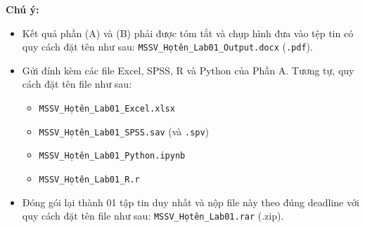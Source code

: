 \textbf{Chú ý:}
\begin{itemize}
    \item Kết quả phần (A) và (B) phải được tóm tắt và chụp hình đưa vào tệp tin có quy cách đặt tên như sau: \texttt{MSSV\_Họtên\_Lab01\_Output.docx} (\texttt{.pdf}).
    \item Gửi đính kèm các file Excel, SPSS, R và Python của Phần A. Tương tự, quy cách đặt tên file như sau:
    \begin{itemize}
        \item \texttt{MSSV\_Họtên\_Lab01\_Excel.xlsx}
        \item \texttt{MSSV\_Họtên\_Lab01\_SPSS.sav} (và \texttt{.spv})
        \item \texttt{MSSV\_Họtên\_Lab01\_Python.ipynb}
        \item \texttt{MSSV\_Họtên\_Lab01\_R.r}
    \end{itemize}
    \item Đóng gói lại thành 01 tập tin duy nhất và nộp file này theo đúng deadline với quy cách đặt tên file như sau: \texttt{MSSV\_Họtên\_Lab01.rar} (.zip).
\end{itemize}


